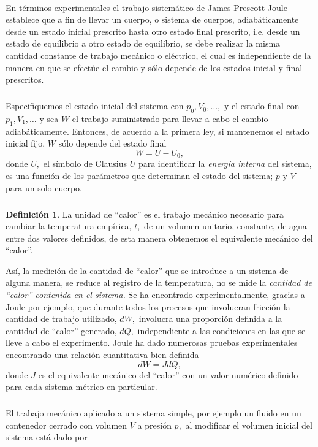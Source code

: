 \documentclass{article}
\theoremstyle{definition} \newtheorem{defi}{Definici\'on}
\theoremstyle{definition} \newtheorem{teo}{Teorema}
\theoremstyle{definition} \newtheorem{cor}{Corolario}
\begin{document}
\paragraph{}
En t\'erminos experimentales el trabajo sistem\'atico de James Prescott Joule establece que a fin de llevar un cuerpo, o sistema de cuerpos, adiab\'aticamente desde un estado inicial prescrito hasta otro estado final prescrito, i.e. desde un estado de equilibrio a otro estado de equilibrio, se debe realizar la misma cantidad constante de trabajo mec\'anico o el\'ectrico, el cual es independiente de la manera en que se efect\'ue el cambio y s\'olo depende de los estados inicial y final prescritos.
\subparagraph{}
Especifiquemos el estado inicial del sistema con $p_0, V_0,\dots,$ y el estado final con $p_1, V_1,\dots$ y sea $W$ el trabajo suministrado para llevar a cabo el cambio adiab\'aticamente. Entonces, de acuerdo a la primera ley, si mantenemos el estado inicial fijo, $W$ s\'olo depende del estado final
$$W=U-U_0,$$
donde $U,$ el s\'imbolo de Clausius $U$ para identificar la \emph{energ\'ia interna} del sistema, es una funci\'on de los par\'ametros que determinan el estado del sistema; $p$ y $V$ para un solo cuerpo.
\subparagraph{}
\begin{defi}
La unidad de ``calor'' es el trabajo mec\'anico necesario para cambiar la temperatura emp\'irica, $t,$ de un volumen unitario, constante, de agua entre dos valores definidos, de esta manera obtenemos el equivalente mec\'anico del ``calor''.
\end{defi}
As\'i, la medici\'on de la cantidad de ``calor'' que se introduce a un sistema de alguna manera, se reduce al registro de la temperatura, no se mide la \emph{cantidad de ``calor'' contenida en el sistema.} Se ha encontrado experimentalmente, gracias a Joule por ejemplo, que durante todos los procesos que involucran fricci\'on la cantidad de trabajo utilizado, $dW,$ involucra una proporci\'on definida a la cantidad de ``calor'' generado, $dQ,$ independiente a las condiciones en las que se lleve a cabo el experimento. Joule ha dado numerosas pruebas experimentales encontrando una relaci\'on cuantitativa bien definida
\begin{equation}\label{mecheat}
dW=JdQ,
\end{equation}
donde $J$ es el equivalente mec\'anico del ``calor'' con un valor num\'erico definido para cada sistema m\'etrico en particular.
\subparagraph{}
El trabajo mec\'anico aplicado a un sistema simple, por ejemplo un fluido en un contenedor cerrado con volumen $V$ a presi\'on $p,$  al modificar el volumen inicial del sistema est\'a dado por
\end{document}
